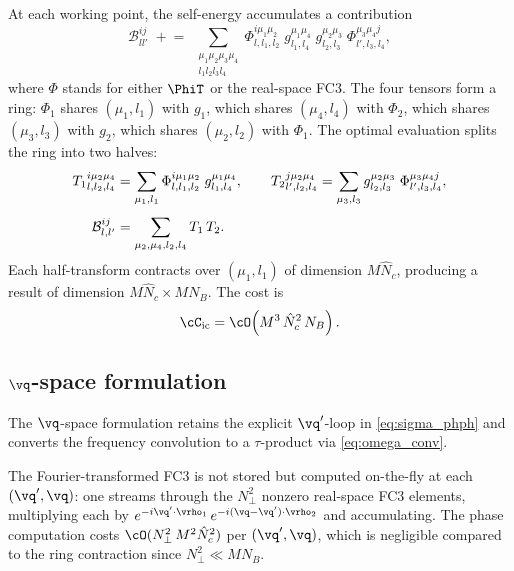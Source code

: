 At each working point, the self-energy accumulates a contribution
\begin{equation}
  \mathcal{B}^{ij}_{ll'}
  \;\mathrel{+}=\;
  \sum_{\substack{\mu_1 \mu_2 \mu_3 \mu_4\\l_1 l_2 l_3 l_4}}
  \Phi^{i\mu_1\mu_2}_{l,l_1,l_2}\;
  g^{\mu_1\mu_4}_{l_1,l_4}\;
  g^{\mu_2\mu_3}_{l_2,l_3}\;
  \Phi^{\mu_3\mu_4 j}_{l',l_3,l_4},
  \label{eq:inner_contraction}
\end{equation}
where $\Phi$ stands for either $\PhiT$ or the real-space FC3.
The four tensors form a ring: $\Phi_1$ shares $(\mu_1,l_1)$ with
$g_1$, which shares $(\mu_4,l_4)$ with $\Phi_2$, which shares
$(\mu_3,l_3)$ with $g_2$, which shares $(\mu_2,l_2)$ with
$\Phi_1$.  The optimal evaluation splits the ring into two halves:
\begin{align}
  {T_1}^{i\mu_2\mu_4}_{l,l_2,l_4}
  &= \sum_{\mu_1,l_1}
     \Phi^{i\mu_1\mu_2}_{l,l_1,l_2}\;g^{\mu_1\mu_4}_{l_1,l_4},
  \qquad
  {T_2}^{j\mu_2\mu_4}_{l',l_2,l_4}
  = \sum_{\mu_3,l_3}
     g^{\mu_2\mu_3}_{l_2,l_3}\;
     \Phi^{\mu_3\mu_4 j}_{l',l_3,l_4},
  \notag\\[4pt]
  \mathcal{B}^{ij}_{l,l'}
  &= \sum_{\mu_2,\mu_4,l_2,l_4} T_1\,T_2.
  \label{eq:balanced_tree}
\end{align}
Each half-transform contracts over $(\mu_1,l_1)$ of dimension
$M\hat{N}_c$, producing a result of dimension
$M\hat{N}_c \times MN_B$.  The cost is
\begin{equation}
  \cC_\mathrm{ic}
  = \cO\!\left(M^3\,\hat{N}_c^2\,N_B\right).
  \label{eq:cost_ic}
\end{equation}


\subsection{\texorpdfstring{$\vq$}{q}-space formulation}
\label{sub:q_space}

The $\vq$-space formulation retains the explicit $\vq'$-loop in
\cref{eq:sigma_phph} and converts the frequency convolution to a
$\tau$-product via \cref{eq:omega_conv}.

The Fourier-transformed FC3 is not stored but computed
on-the-fly at each $(\vq',\vq)$: one streams through the
$N_\perp^2$ nonzero real-space FC3 elements, multiplying each by
$e^{-i\vq'\cdot\vrho_1}\,e^{-i(\vq-\vq')\cdot\vrho_2}$ and
accumulating.  The phase computation costs
$\cO(N_\perp^2\,M^2\hat{N}_c^2)$ per $(\vq',\vq)$, which is
negligible compared to the ring contraction since
$N_\perp^2 \ll MN_B$.

